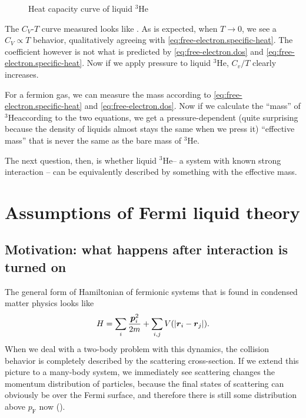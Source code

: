 \documentclass[hyperref, a4paper]{article}
\newcommand*{\pfermi}{p_{\text{F}}}
\newcommand*{\hethree}{$^3$He}
\begin{document}
\begin{figure}
    \centering
    
    \caption{Heat capacity curve of liquid \hethree}
    \label{fig:he-heat-capacity}
\end{figure}

The $C_V$-$T$ curve measured looks like .
As is expected, 
when $T \to 0$, 
we see a $C_V \propto T$ behavior, 
qualitatively agreeing with \eqref{eq:free-electron.specific-heat}.
The coefficient however is not what is predicted by 
\eqref{eq:free-electron.dos} and
\eqref{eq:free-electron.specific-heat}.
Now if we apply pressure to liquid \hethree, 
$C_v / T$ clearly increases. 

For a fermion gas, 
we can measure the mass according to \eqref{eq:free-electron.specific-heat}
and \eqref{eq:free-electron.dos}. 
Now if we calculate the ``mass'' of \hethree according to the two equations, 
we get a pressure-dependent 
(quite surprising because the density of liquids almost stays the same when we press it)
``effective mass''
that is never the same as the bare mass of \hethree.

The next question, then, 
is whether liquid \hethree -- 
a system with known strong interaction -- 
can be equivalently described 
by something with the effective mass. 

\section{Assumptions of Fermi liquid theory}

\subsection{Motivation: what happens after interaction is turned on}\label{sec:collision-scaling}

The general form of Hamiltonian of fermionic systems 
that is found in condensed matter physics looks like 
\begin{equation}
    H = \sum_i \frac{\vb*{p}_i^2}{2m} + 
    \sum_{i, j} V(\abs{\vb*{r}_i - \vb*{r}_j}).
\end{equation}
When we deal with a two-body problem with this dynamics, 
the collision behavior is completely described
by the scattering cross-section. 
If we extend this picture to a many-body system,
we immediately see scattering changes 
the momentum distribution of particles, 
because the final states of scattering 
can obviously be over the Fermi surface, 
and therefore there is still some distribution above $\pfermi$ now
(). 
\end{document}
